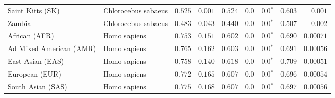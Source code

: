 \begin{center}
\begin{adjustbox}{width = 1\textwidth}
\begin{tabular}{|l|l|r|r|r|r|r|r|r|}
            Saint Kitts (SK)                  & Chlorocebus sabaeus        & $ 0.525$ & $ 0.001$ & $ 0.524$ & $0.0$    & $\bm{0.0{^*}}$    & $ 0.603$ & $ 0.001$ \\
            Zambia        & Chlorocebus sabaeus        & $ 0.483$ & $ 0.043$ & $ 0.440$ & $0.0$    & $\bm{0.0{^*}}$ & $ 0.507$ & $ 0.002$ \\
            African (AFR)               & Homo sapiens        & $ 0.753$ & $ 0.151$ & $ 0.602$ & $0.0$    & $\bm{0.0{^*}}$    & $ 0.690$ & $0.00071$ \\
            Ad Mixed American (AMR)                 & Homo sapiens        & $ 0.765$ & $ 0.162$ & $ 0.603$ & $0.0$    & $\bm{0.0{^*}}$    & $ 0.691$ & $0.00056$ \\
            East Asian (EAS)              & Homo sapiens        & $ 0.758$ & $ 0.140$ & $ 0.618$ & $0.0$    & $\bm{0.0{^*}}$    & $ 0.709$ & $0.00051$ \\
            European (EUR)              & Homo sapiens        & $ 0.772$ & $ 0.165$ & $ 0.607$ & $0.0$    & $\bm{0.0{^*}}$    & $ 0.696$ & $0.00054$ \\
            South Asian (SAS)              & Homo sapiens        & $ 0.775$ & $ 0.168$ & $ 0.607$ & $0.0$    & $\bm{0.0{^*}}$    & $ 0.697$ & $0.00056$ \\
            \bottomrule
        \end{tabular}
    \end{adjustbox}
\end{center}